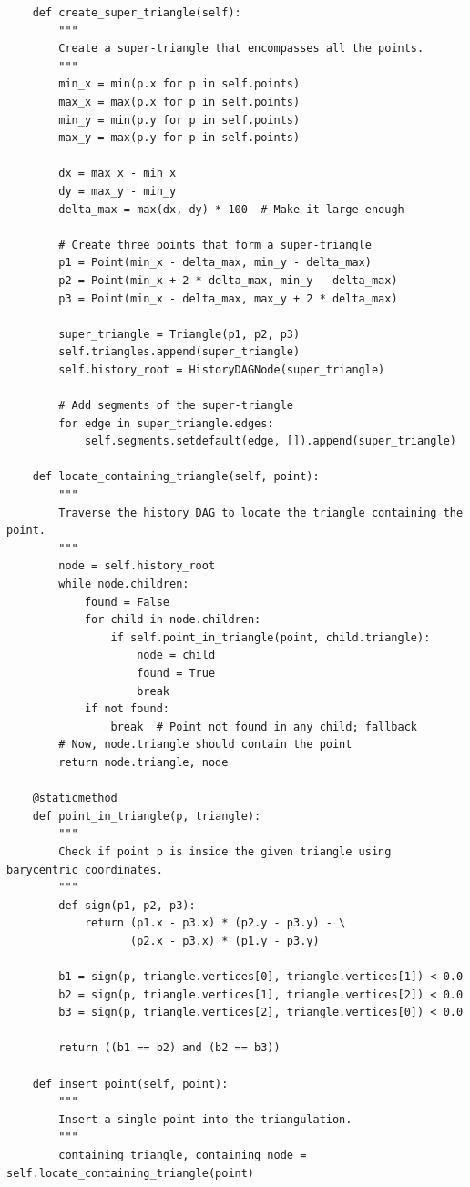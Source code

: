\documentclass{article}
\begin{document}
\begin{verbatim}
    def create_super_triangle(self):
        """
        Create a super-triangle that encompasses all the points.
        """
        min_x = min(p.x for p in self.points)
        max_x = max(p.x for p in self.points)
        min_y = min(p.y for p in self.points)
        max_y = max(p.y for p in self.points)

        dx = max_x - min_x
        dy = max_y - min_y
        delta_max = max(dx, dy) * 100  # Make it large enough

        # Create three points that form a super-triangle
        p1 = Point(min_x - delta_max, min_y - delta_max)
        p2 = Point(min_x + 2 * delta_max, min_y - delta_max)
        p3 = Point(min_x - delta_max, max_y + 2 * delta_max)

        super_triangle = Triangle(p1, p2, p3)
        self.triangles.append(super_triangle)
        self.history_root = HistoryDAGNode(super_triangle)

        # Add segments of the super-triangle
        for edge in super_triangle.edges:
            self.segments.setdefault(edge, []).append(super_triangle)

    def locate_containing_triangle(self, point):
        """
        Traverse the history DAG to locate the triangle containing the point.
        """
        node = self.history_root
        while node.children:
            found = False
            for child in node.children:
                if self.point_in_triangle(point, child.triangle):
                    node = child
                    found = True
                    break
            if not found:
                break  # Point not found in any child; fallback
        # Now, node.triangle should contain the point
        return node.triangle, node

    @staticmethod
    def point_in_triangle(p, triangle):
        """
        Check if point p is inside the given triangle using barycentric coordinates.
        """
        def sign(p1, p2, p3):
            return (p1.x - p3.x) * (p2.y - p3.y) - \
                   (p2.x - p3.x) * (p1.y - p3.y)

        b1 = sign(p, triangle.vertices[0], triangle.vertices[1]) < 0.0
        b2 = sign(p, triangle.vertices[1], triangle.vertices[2]) < 0.0
        b3 = sign(p, triangle.vertices[2], triangle.vertices[0]) < 0.0

        return ((b1 == b2) and (b2 == b3))

    def insert_point(self, point):
        """
        Insert a single point into the triangulation.
        """
        containing_triangle, containing_node = self.locate_containing_triangle(point)


\end{verbatim}
\end{document}
